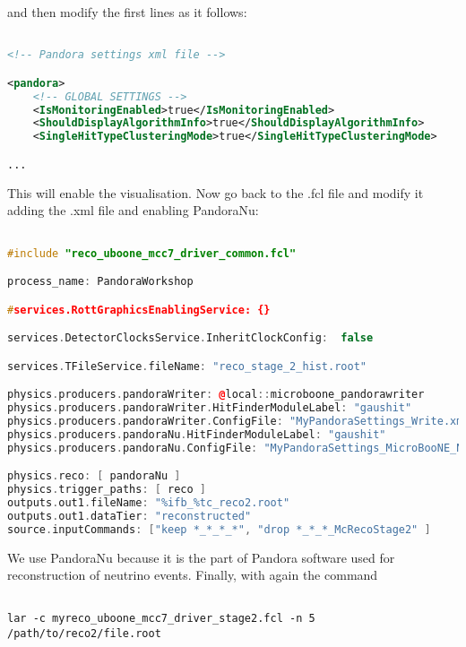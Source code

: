 and then modify the first lines as it follows:

\begin{lstlisting}[language=XML, caption=Python example]

<!-- Pandora settings xml file -->

<pandora>
    <!-- GLOBAL SETTINGS -->
    <IsMonitoringEnabled>true</IsMonitoringEnabled>
    <ShouldDisplayAlgorithmInfo>true</ShouldDisplayAlgorithmInfo>
    <SingleHitTypeClusteringMode>true</SingleHitTypeClusteringMode>

...

\end{lstlisting}

This will enable the visualisation. Now go back to the .fcl file and modify it adding the .xml file and enabling PandoraNu:

\begin{lstlisting}[language=C++, caption=Python example]

#include "reco_uboone_mcc7_driver_common.fcl"

process_name: PandoraWorkshop

#services.RottGraphicsEnablingService: {}

services.DetectorClocksService.InheritClockConfig:  false

services.TFileService.fileName: "reco_stage_2_hist.root"

physics.producers.pandoraWriter: @local::microboone_pandorawriter
physics.producers.pandoraWriter.HitFinderModuleLabel: "gaushit"
physics.producers.pandoraWriter.ConfigFile: "MyPandoraSettings_Write.xml"
physics.producers.pandoraNu.HitFinderModuleLabel: "gaushit"
physics.producers.pandoraNu.ConfigFile: "MyPandoraSettings_MicroBooNE_Neutrino.xml"

physics.reco: [ pandoraNu ]
physics.trigger_paths: [ reco ]
outputs.out1.fileName: "%ifb_%tc_reco2.root"
outputs.out1.dataTier: "reconstructed"
source.inputCommands: ["keep *_*_*_*", "drop *_*_*_McRecoStage2" ]

\end{lstlisting}

We use PandoraNu because it is the part of Pandora software used for reconstruction of neutrino events. Finally, with again the command

\begin{verbatim}

lar -c myreco_uboone_mcc7_driver_stage2.fcl -n 5 /path/to/reco2/file.root 

\end{verbatim}

